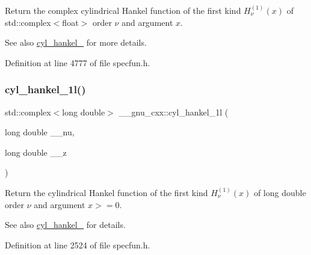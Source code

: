 Return the complex cylindrical Hankel function of the first kind $ H^{(1)}_\nu(x) $ of {\ttfamily std\+::complex$<$float$>$} order $ \nu $ and argument $ x $.

\begin{DoxySeeAlso}{See also}
\hyperlink{group__gnu__math__spec__func_ga5329bba77d10a9d2f15d9bbe43a70db3}{cyl\+\_\+hankel\+\_} for more details. 
\end{DoxySeeAlso}


Definition at line 4777 of file specfun.\+h.

\mbox{\label{group__gnu__math__spec__func_gacb49c66b4267fbc56906db02f14365f2}} 
\subsubsection{\texorpdfstring{cyl\+\_\+hankel\+\_\+1l()}{cyl\_hankel\_1l()}\hspace{0.1cm}{\footnotesize\ttfamily [1/2]}}
{\footnotesize\ttfamily std\+::complex$<$long double$>$ \+\_\+\+\_\+gnu\+\_\+cxx\+::cyl\+\_\+hankel\+\_\+1l (\begin{DoxyParamCaption}\item[{long double}]{\+\_\+\+\_\+nu,  }\item[{long double}]{\+\_\+\+\_\+z }\end{DoxyParamCaption})\hspace{0.3cm}{\ttfamily [inline]}}

Return the cylindrical Hankel function of the first kind $ H^{(1)}_\nu(x) $ of {\ttfamily long double} order $ \nu $ and argument $ x >= 0 $.

\begin{DoxySeeAlso}{See also}
\hyperlink{group__gnu__math__spec__func_ga5329bba77d10a9d2f15d9bbe43a70db3}{cyl\+\_\+hankel\+\_} for details. 
\end{DoxySeeAlso}


Definition at line 2524 of file specfun.\+h.

\mbox{\label{group__gnu__math__spec__func_ga6900f79ec70673bcb001538aec74e07c}} 
